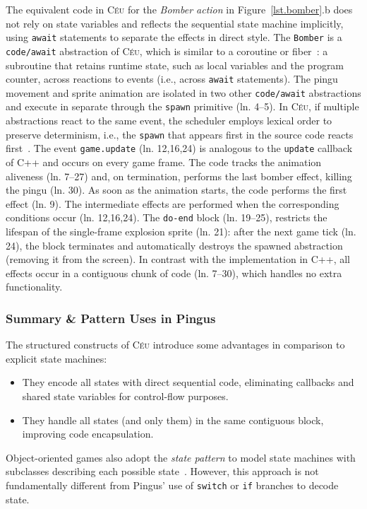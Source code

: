 \documentclass{vgtc}                          %
\newcommand{\CEU}{\textsc{C\'{e}u}\xspace}
\newcommand{\code}[1] {{\small{\texttt{#1}}}}
\begin{document}
The equivalent code in \CEU for the \emph{Bomber action} in
Figure~\ref{lst.bomber}.b does not rely on state variables and reflects the
sequential state machine implicitly, using \code{await} statements to separate
the effects in direct style.
%
The \code{Bomber} is a \code{code/await} abstraction of \CEU, which is similar
to a coroutine or fiber~\cite{sync_async.cooperative}: a subroutine that
retains runtime state, such as local variables and the program counter, across
reactions to events (i.e., across \code{await} statements).
The pingu movement and sprite animation are isolated in two other
\code{code/await} abstractions and execute in separate through the \code{spawn}
primitive (ln. 4--5).
In \CEU, if multiple abstractions react to the same event, the scheduler
employs lexical order to preserve determinism, i.e., the \code{spawn} that
appears first in the source code reacts first~\cite{ceu.mod15}.
The event \code{game.update} (ln. 12,16,24) is analogous to the \code{update}
callback of C++ and occurs on every game frame.
%
The code tracks the animation aliveness (ln. 7--27) and, on termination,
performs the last bomber effect, killing the pingu (ln. 30).
As soon as the animation starts, the code performs the first effect (ln. 9).
The intermediate effects are performed when the corresponding conditions occur
(ln. 12,16,24).
The \code{do-end} block (ln. 19--25), restricts the lifespan of the
single-frame explosion sprite (ln. 21): after the next game tick (ln. 24), the
block terminates and automatically destroys the spawned abstraction (removing
it from the screen).
%
In contrast with the implementation in C++, all effects occur in a contiguous
chunk of code (ln. 7--30), which handles no extra functionality.

\subsubsection{Summary \& Pattern Uses in Pingus}

The structured constructs of \CEU introduce some advantages in comparison to 
explicit state machines:
%
\begin{itemize}
\item They encode all states with direct sequential code, eliminating callbacks
      and shared state variables for control-flow purposes.
\item They handle all states (and only them) in the same contiguous block,
      improving code encapsulation.
\end{itemize}
%
Object-oriented games also adopt the \emph{state pattern} to model state
machines with subclasses describing each possible state~\cite{games.patterns}.
However, this approach is not fundamentally different from Pingus' use of
\code{switch} or \code{if} branches to decode state.
\end{document}
